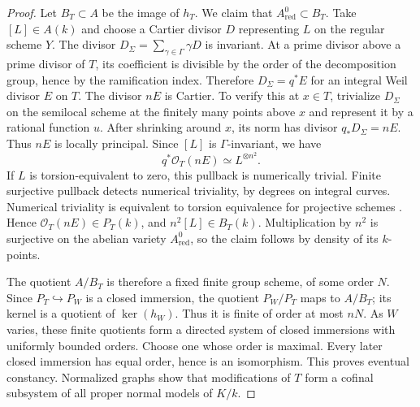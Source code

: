 \begin{proof}
Let $B_T\subset A$ be the image of $h_T$.  We claim that
$A_{\mathrm{red}}^0\subset B_T$.  Take $[L]\in A(k)$ and choose
a Cartier divisor $D$ representing $L$ on the regular scheme $Y$.
The divisor $D_\Sigma=\sum_{\gamma\in\Gamma}\gamma D$ is invariant.
At a prime divisor above a prime divisor of $T$, its coefficient is
divisible by the order of the decomposition group, hence by the
ramification index.  Therefore $D_\Sigma=q^*E$ for an integral Weil
divisor $E$ on $T$.  The divisor $nE$ is Cartier.  To verify this at
$x\in T$, trivialize $D_\Sigma$ on the semilocal scheme at the
finitely many points above $x$ and represent it by a rational
function $u$.  After shrinking around $x$, its norm has divisor
$q_*D_\Sigma=nE$.  Thus $nE$ is locally principal.
Since $[L]$ is $\Gamma$-invariant, we have
\[
 q^*\mathcal O_T(nE)\simeq L^{\otimes n^2}.
\]
If $L$ is torsion-equivalent to zero, this pullback is numerically
trivial.  Finite surjective pullback detects numerical triviality,
by degrees on integral curves.  Numerical triviality is equivalent
to torsion equivalence for projective schemes
\cite[Theorem 6.3]{Kleiman2005}.  Hence
$\mathcal O_T(nE)\in P_T(k)$, and $n^2[L]\in B_T(k)$.
Multiplication by $n^2$ is surjective on the abelian variety
$A_{\mathrm{red}}^0$, so the claim follows by density of its $k$-points.

The quotient $A/B_T$ is therefore a fixed finite group scheme, of
some order $N$.  Since $P_T\hookrightarrow P_W$ is a closed immersion,
the quotient $P_W/P_T$ maps to $A/B_T$; its kernel is a quotient
of $\ker(h_W)$.  Thus it is finite of order at most $nN$.
As $W$ varies, these finite quotients form a directed system of
closed immersions with uniformly bounded orders.  Choose one whose
order is maximal.  Every later closed immersion has equal order,
hence is an isomorphism.  This proves eventual constancy.  Normalized
graphs show that modifications of $T$ form a cofinal subsystem of
all proper normal models of $K/k$.
\end{proof}

